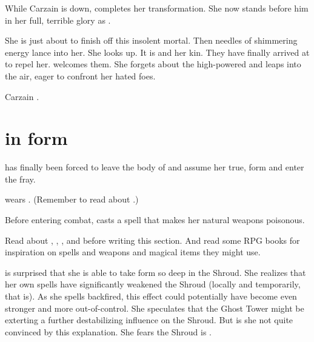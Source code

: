 While Carzain is down, \Takestsha completes her transformation.
She now stands before him in her full, terrible glory as \Nzessuacrith. 

She is just about to finish off this insolent mortal.
Then needles of shimmering energy lance into her.
She looks up.
It is \Achsah and her \resphan kin.
They have finally arrived at \Forclin to repel her.
\Nzessuacrith welcomes them.
She forgets about the high-powered \human and leaps into the air, eager to confront her hated foes. 

Carzain . 





\section{\Nzessuacrith in \draconian form}
\Nzessuacrith{} has finally been forced to leave the body of \Takestsha{} and assume her true, \draconic{} form and enter the fray. 

\Nzessuacrith{} wears . 
(Remember to read about .)

Before entering combat, \Nzessuacrith{} casts a spell that makes her natural weapons poisonous. 

Read about , , ,  and  before writing this section. 
And read some RPG books for inspiration on spells and weapons and magical items they might use. 

\Nzessuacrith{} is surprised that she is able to take \draconic{} form so deep in the Shroud. 
She realizes that her own \EreshKali spells have significantly weakened the Shroud (locally and temporarily, that is).
As she spells backfired, this effect could potentially have become even stronger and more out-of-control. 
She speculates that the Ghost Tower might be exterting a further destabilizing influence on the Shroud. 
But is she not quite convinced by this explanation. 
She fears the Shroud is . 

\begin{prose}
\end{prose}

